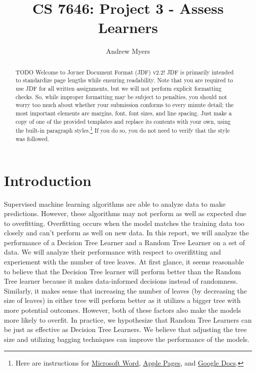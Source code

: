 \documentclass[
	letterpaper, %
]{jdf}
\author{Andrew Myers}
\title{CS 7646: Project 3 - Assess Learners}
\begin{document}

\maketitle

\begin{abstract}
	TODO
	Welcome to Joyner Document Format (JDF) v2.2! JDF is primarily intended to standardize page lengths while ensuring readability. 
	Note that you are required to use JDF for all written assignments, but we will not perform explicit formatting checks. 
	So, while improper formatting may be subject to penalties, you should not worry too much about whether your submission conforms to 
	every minute detail; the most important elements are margins, font, font sizes, and line spacing. Just make a copy of one of the provided templates 
	and replace its contents with your own, using the built-in paragraph styles.\footnote{Here are instructions for 
	\href{https://support.office.com/en-us/article/Video-Using-Styles-in-Word-9db4c0f4-2754-4294-9758-c14a0abd8cfa}{Microsoft Word}, 
	\href{https://support.apple.com/guide/pages/intro-to-paragraph-styles-tanaa39b0aa3/mac}{Apple Pages}, and 
	\href{https://www.bazroberts.com/2016/04/19/google-docs-paragraph-styles-headings/}{Google Docs}.} If you do so, you do not need to verify that the style was followed.
\end{abstract}

\section{Introduction}
Supervised machine learning algorithms are able to analyze data to make predictions.
However, these algorithms may not perform as well as expected due to overfitting.
Overfitting occurs when the model matches the training data too closely and can't perform as well on new data.
In this report, we will analyze the performance of a Decision Tree Learner and a Random Tree Learner on a set of data.
We will analyze their performance with respect to overifitting and experiement with the number of tree leaves.
At first glance, it seems reasonable to believe that the Decision Tree learner will perform better than the Random Tree learner because it makes data-informed decisions instead of randomness.
Similarly, it makes sense that increasing the number of leaves (by decreasing the size of leaves) in either tree will perform better as it utilizes a bigger tree with more potential outcomes.
However, both of these factors also make the models more likely to overfit.
In practice, we hypothesize that Random Tree Learners can be just as effective as Decision Tree Learners.
We believe that adjusting the tree size and utilizing bagging techniques can improve the performance of the models.
\end{document}
